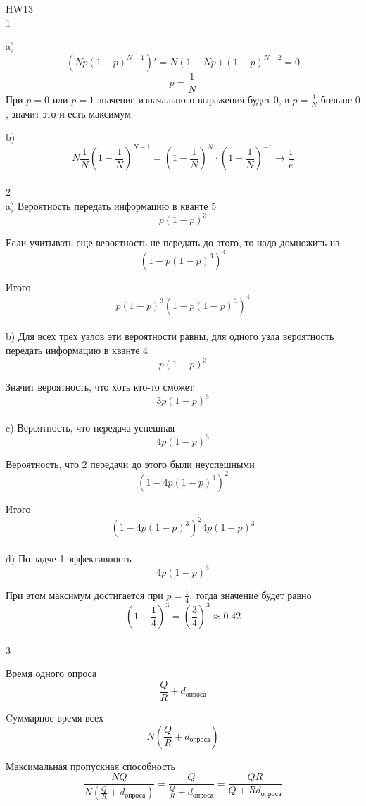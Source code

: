 \documentclass[a4paper,11pt]{article}
\begin{document}
\Large
HW13
\\
1

a) $$(Np(1 - p)^{N - 1})' = N (1 - Np) (1 - p)^{N - 2} = 0$$
$$p = \frac{1}{N}$$
При $p = 0$ или $p = 1$ значение изначального выражения будет $0$, в $p = \frac{1}{N}$ больше $0$, значит это и есть максимум

b) $$N \frac{1}{N} (1 - \frac{1}{N})^{N - 1} = (1 - \frac{1}{N})^N \cdot (1 - \frac{1}{N})^{-1} \to \frac{1}{e}$$
\\
2
\\
a) Вероятность передать информацию в кванте 5 $$p(1 - p)^3$$ 

Если учитывать еще вероятность не передать до этого, то надо домножить на $$(1 - p(1 - p)^3)^4$$ 

Итого $$p(1 - p)^3(1 - p(1 - p)^3)^4$$
\\
b) Для всех трех узлов эти вероятности равны, для одного узла вероятность передать информацию в кванте 4 $$p(1 - p)^3$$

Значит вероятность, что хоть кто-то сможет $$3p(1- p)^3$$
\\
c) Вероятность, что передача успешная $$4p(1 - p)^3$$

Вероятность, что 2 передачи до этого были неуспешными $$(1 - 4p(1 - p)^3)^2$$

Итого $$(1 - 4p(1 - p)^3)^2 4p(1 - p)^3$$
\\
d) По задче 1 эффективность $$4p(1 - p)^3$$

При этом максимум достигается при $p = \frac{1}{4}$, тогда значение будет равно $$(1 - \frac{1}{4})^3 = (\frac{3}{4})^3 \approx 0.42$$
\\
3

Время одного опроса 
$$\frac{Q}{R} + d_{\text{опроса}}$$

Cуммарное время всех 
$$N(\frac{Q}{R} + d_{\text{опроса}})$$

Максимальная пропускная способность 
$$\frac{NQ}{N(\frac{Q}{R} + d_{\text{опроса}})} = \frac{Q}{\frac{Q}{R} + d_{\text{опроса}}} = \frac{QR}{Q + R d_{\text{опроса}}}$$
\end{document}

